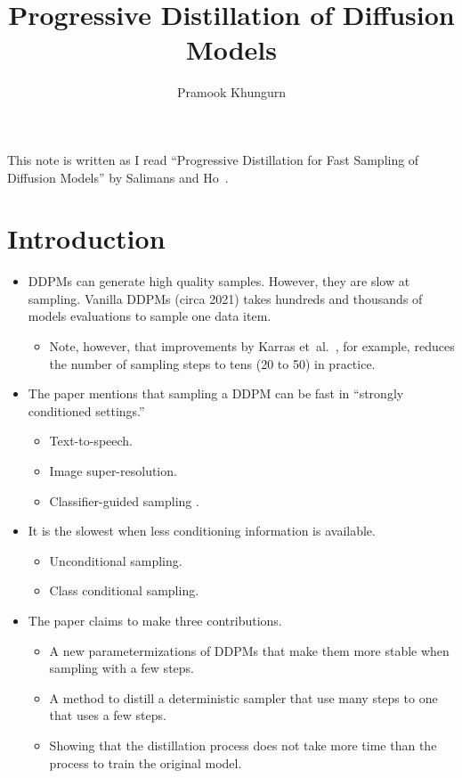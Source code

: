 \documentclass[10pt]{article}
\title{Progressive Distillation of Diffusion Models}
\author{Pramook Khungurn}
\newcommand{\etal}{{et~al.}}
\begin{document}
\maketitle

This note is written as I read ``Progressive Distillation for Fast Sampling of Diffusion Models'' by Salimans and Ho~\cite{Salimans:2022}.

\section{Introduction}

\begin{itemize}
  \item DDPMs can generate high quality samples. However, they are slow at sampling. Vanilla DDPMs (circa 2021) takes hundreds and thousands of models evaluations to sample one data item.
  \begin{itemize}
    \item Note, however, that improvements by Karras \etal~\cite{Karras:2022}, for example, reduces the number of sampling steps to tens (20 to 50) in practice.
  \end{itemize}

  \item The paper mentions that sampling a DDPM can be fast in ``strongly conditioned settings.''
  \begin{itemize}
    \item Text-to-speech.
    \item Image super-resolution.
    \item Classifier-guided sampling \cite{Dhariwal:2021}.
  \end{itemize}
  
  \item It is the slowest when less conditioning information is available.
  \begin{itemize}
    \item Unconditional sampling.
    \item Class conditional sampling.
  \end{itemize}

  \item The paper claims to make three contributions.
  \begin{itemize}
    \item A new parametermizations of DDPMs that make them more stable when sampling with a few steps.
    \item A method to distill a deterministic sampler that use many steps to one that uses a few steps.
    \item Showing that the distillation process does not take more time than the process to train the original model.
  \end{itemize}


\end{itemize}
\end{document}
